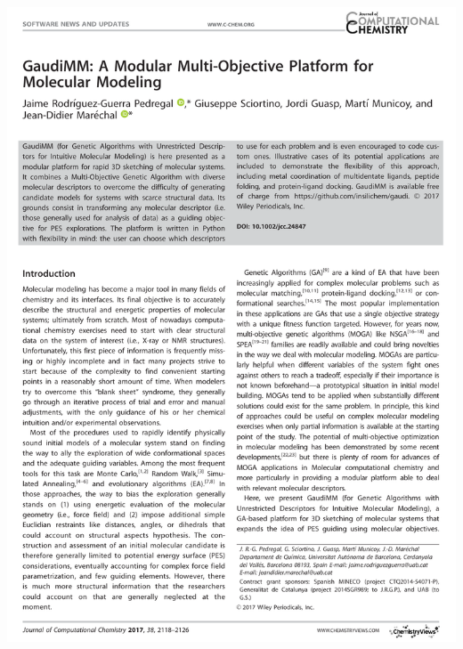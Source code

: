 \includegraphics[width=\textwidth]{figures/pubs/gaudimm.pdf}
\clearpage\thispagestyle{empty}\mbox{}\clearpage
